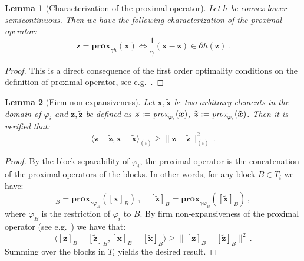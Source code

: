 \documentclass{article}
\def\prox{{\mathbf{prox}}}
\def\eprox{{\emph{\text{prox}}}}
\def\xx{{\boldsymbol x}}
\def\zz{{\boldsymbol z}}
\newtheorem{lemma}{Lemma}
\renewcommand{\llbracket}{[}
\renewcommand{\rrbracket}{]}
\begin{document}
\hfill

\begin{lemma}[Characterization of the proximal operator]\label{lemma:charac_prox}
  Let $h$ be convex lower semicontinuous. Then we have the following characterization of the proximal operator:
  \begin{equation}\label{eq:prox_char}
    \zz = \prox_{\gamma h}(\xx)  \iff  \frac{1}{\gamma}(\xx - \zz) \in \partial h(\zz)\,.
  \end{equation}
\end{lemma}
\begin{proof}
  This is a direct consequence of the first order optimality conditions on the definition of proximal operator, see e.g.~\citep{beck2009gradient, nesterov20013gradient}.
\end{proof}

\hfill

\begin{lemma}[Firm non-expansiveness]\label{lemmma:block_nonexpansive}
  Let $\xx, \tilde{\xx}$ be two arbitrary elements in the domain of $\varphi_i$ and $\zz, \tilde{\zz}$ be defined as $\zz := \eprox_{\varphi_i}(\xx)$, $\tilde{\zz} := \eprox_{\varphi_i}(\tilde{\xx})$. Then it is verified that:
\begin{equation}
\langle \zz - \tilde{\zz}, \xx - \tilde{\xx} \rangle_{(i)} \geq \|\zz - \tilde{\zz}\|_{(i)}^2\,.
\end{equation}
\end{lemma}
\begin{proof}
  By the block-separability of $\varphi_i$, the proximal operator is the concatenation of the proximal operators of the blocks. In other words, for any block $B \in T_i$ we have:
\begin{equation}
  \llbracket\zz\rrbracket_B = \prox_{\gamma \varphi_B}(\llbracket\xx\rrbracket_B)~,\quad \llbracket\tilde{\zz}\rrbracket_B = \prox_{\gamma \varphi_B}(\llbracket\tilde{\xx}\rrbracket_B)\,,
\end{equation}
where $\varphi_B$ is the restriction of $\varphi_i$ to $B$.
  By firm non-expansiveness of the proximal operator (see e.g.~\citet[Proposition 4.2]{bauschke2011convex}) we have that:
  $$
  \langle \llbracket\zz\rrbracket_B - \llbracket\tilde{\zz}\rrbracket_B, \llbracket\xx\rrbracket_B - \llbracket\tilde{\xx}\rrbracket_B\rangle \geq \|\llbracket\zz\rrbracket_B - \llbracket\tilde{\zz}\rrbracket_B\|^2 \,.
  $$
Summing over the blocks in $T_i$ yields the desired result.
\end{proof}
\end{document}
